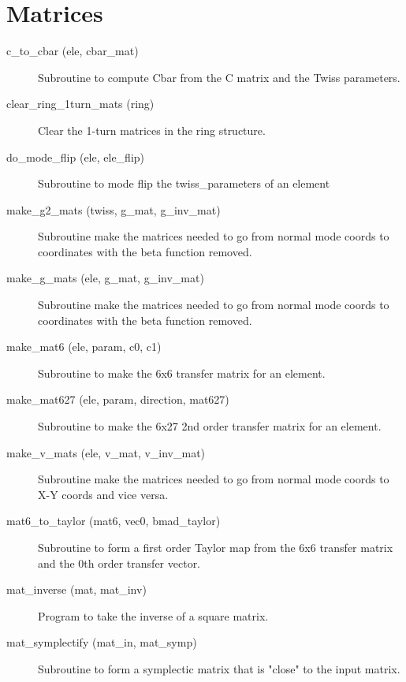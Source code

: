\section{Matrices}
\label{r:mat}

\begin{description}

\item[c\_to\_cbar (ele, cbar\_mat)] \Newline
Subroutine to compute Cbar from the C matrix and the Twiss parameters. 

\item[clear\_ring\_1turn\_mats (ring)] \Newline
Clear the 1-turn matrices in the ring structure. 

\item[do\_mode\_flip (ele, ele\_flip)] \Newline
Subroutine to mode flip the twiss\_parameters of an element 

\item[make\_g2\_mats (twiss, g\_mat, g\_inv\_mat)] \Newline
Subroutine make the matrices needed to go from normal mode coords to coordinates with the beta function removed. 

\item[make\_g\_mats (ele, g\_mat, g\_inv\_mat)] \Newline
Subroutine make the matrices needed to go from normal mode coords to coordinates with the beta function removed. 

\item[make\_mat6 (ele, param, c0, c1)] \Newline
Subroutine to make the 6x6 transfer matrix for an element. 

\item[make\_mat627 (ele, param, direction, mat627)] \Newline
Subroutine to make the 6x27 2nd order transfer matrix for an element. 

\item[make\_v\_mats (ele, v\_mat, v\_inv\_mat)] \Newline
Subroutine make the matrices needed to go from normal mode coords to X-Y coords and vice versa. 

\item[mat6\_to\_taylor (mat6, vec0, bmad\_taylor)] \Newline
Subroutine to form a first order Taylor map from the 6x6 transfer matrix and the 0th order transfer vector. 

\item[mat\_inverse (mat, mat\_inv)] \Newline
Program to take the inverse of a square matrix. 

\item[mat\_symplectify (mat\_in, mat\_symp)] \Newline
Subroutine to form a symplectic matrix that is "close" to the input matrix. 


\end{description}
